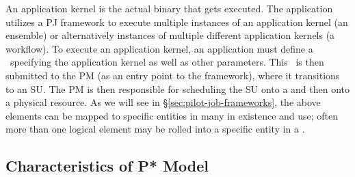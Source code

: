 \documentclass[conference]{IEEEtran}
\begin{document}




  An application kernel is the actual binary that gets executed.  The
  application utilizes a PJ framework to execute multiple instances of
  an application kernel (an ensemble) or alternatively instances of
  multiple different application kernels (a workflow).  To execute an
  application kernel, an application must define a \cu \ specifying
  the application kernel as well as other parameters. This \cu \ is
  then submitted to the PM (as an entry point to the \pilotjob
  framework), where it transitions to an SU. The PM is then
  responsible for scheduling the SU onto a \pilot and then onto a
  physical resource.  As we will see in
  \S\ref{sec:pilot-job-frameworks}, the above elements can be mapped
  to specific entities in many \pilotjobs in existence and use; often
  more than one logical element may be rolled into a specific entity
  in a \pilotjob.

% 
% 


\subsection{Characteristics of P* Model}
\label{sec:p_star_elements}
\end{document}
